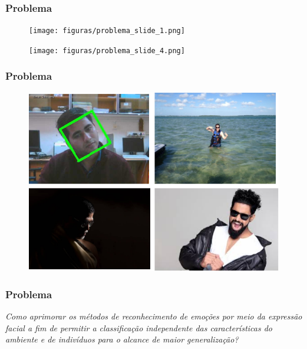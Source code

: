 \documentclass{beamer}
\begin{document}
\begin{frame}
\frametitle{Problema}

\begin{figure}
\centering
\texttt{[image: figuras/problema\_slide\_1.png]}
\label{fig:problema1}
\end{figure}

\begin{figure}
\centering
\texttt{[image: figuras/problema\_slide\_4.png]}
\label{fig:arquitetura1}
\end{figure}
\end{frame}

\begin{frame}
\frametitle{Problema}
\begin{figure}
\centering
\includegraphics[scale=0.39]{figuras/contexto_5.png}
\label{fig:problema1}
\end{figure}
\end{frame}



\begin{frame}
\frametitle{Problema}
\pause
\textit{Como aprimorar os métodos de reconhecimento de emoções por meio da expressão facial a fim de permitir a classificação independente das características do ambiente e de indivíduos para o alcance de maior generalização?} 


\end{frame}
\end{document}
